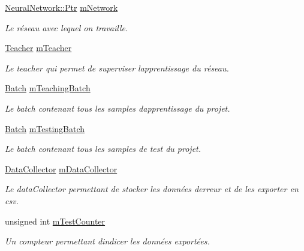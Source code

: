 \begin{DoxyCompactItemize}
\item 
\hyperlink{classNeuralNetwork_a31de381df65f261fd0f38e0559995d1a}{Neural\+Network\+::\+Ptr} \hyperlink{classApplication_aeec81cfdef16dae6f18bc7da55991e45}{m\+Network}
\begin{DoxyCompactList}\small\item\em Le réseau avec lequel on travaille. \end{DoxyCompactList}\item 
\hyperlink{classTeacher}{Teacher} \hyperlink{classApplication_aabafc2a40d05198496fed23f6fe1ea1f}{m\+Teacher}
\begin{DoxyCompactList}\small\item\em Le teacher qui permet de superviser l\textquotesingle{}apprentissage du réseau. \end{DoxyCompactList}\item 
\hyperlink{classApplication_a9888f02149ca3b8ffa499ee07426cd1d}{Batch} \hyperlink{classApplication_a2ccd850b23693fd6d76cad0975a597dd}{m\+Teaching\+Batch}
\begin{DoxyCompactList}\small\item\em Le batch contenant tous les samples d\textquotesingle{}apprentissage du projet. \end{DoxyCompactList}\item 
\hyperlink{classApplication_a9888f02149ca3b8ffa499ee07426cd1d}{Batch} \hyperlink{classApplication_a765dbdcf8fa110557c67fb78cffaceb3}{m\+Testing\+Batch}
\begin{DoxyCompactList}\small\item\em Le batch contenant tous les samples de test du projet. \end{DoxyCompactList}\item 
\hyperlink{classDataCollector}{Data\+Collector} \hyperlink{classApplication_a4409ee4b27b5142510e5be6d41d2a203}{m\+Data\+Collector}
\begin{DoxyCompactList}\small\item\em Le data\+Collector permettant de stocker les données d\textquotesingle{}erreur et de les exporter en csv. \end{DoxyCompactList}\item 
unsigned int \hyperlink{classApplication_a3ee8257a9c7ece037ee91b68d9841002}{m\+Test\+Counter}
\begin{DoxyCompactList}\small\item\em Un compteur permettant d\textquotesingle{}indicer les données exportées. \end{DoxyCompactList}\end{DoxyCompactItemize}


